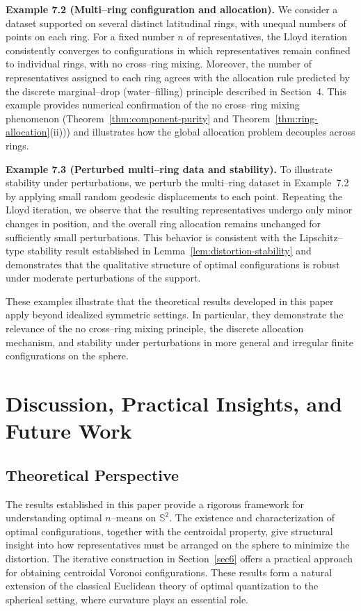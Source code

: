 \documentclass[12pt, reqno]{amsart}
\theoremstyle{plain}
\theoremstyle{definition}
\newcommand{\D}[1]{\mathbb{#1}}%
\begin{document}
\medskip
\noindent\textbf{Example 7.2 (Multi--ring configuration and allocation).}
We consider a dataset supported on several distinct latitudinal rings, with unequal
numbers of points on each ring.
For a fixed number $n$ of representatives, the Lloyd iteration consistently converges
to configurations in which representatives remain confined to individual rings, with
no cross--ring mixing.
Moreover, the number of representatives assigned to each ring agrees with the
allocation rule predicted by the discrete marginal--drop (water--filling) principle
described in Section~4.
This example provides numerical confirmation of the no cross--ring mixing phenomenon
(Theorem~\ref{thm:component-purity} and
Theorem~\ref{thm:ring-allocation}(ii))) and illustrates how the global allocation problem decouples
across rings.

\medskip
\noindent\textbf{Example 7.3 (Perturbed multi--ring data and stability).}
To illustrate stability under perturbations, we perturb the multi--ring dataset in
Example~7.2 by applying small random geodesic displacements to each point.
Repeating the Lloyd iteration, we observe that the resulting representatives undergo
only minor changes in position, and the overall ring allocation remains unchanged for
sufficiently small perturbations.
This behavior is consistent with the Lipschitz--type stability result established in
Lemma~\ref{lem:distortion-stability} and demonstrates that the qualitative structure of optimal configurations is
robust under moderate perturbations of the support.

\medskip
These examples illustrate that the theoretical results developed in this paper apply
beyond idealized symmetric settings.
In particular, they demonstrate the relevance of the no cross--ring mixing principle,
the discrete allocation mechanism, and stability under perturbations in more general
and irregular finite configurations on the sphere.
 
 
 
 
 
 
 
 
 
 
 \section{Discussion, Practical Insights, and Future Work}\label{sec8}

\subsection{Theoretical Perspective}
The results established in this paper provide a rigorous framework for understanding optimal $n$--means on
$\D S^2$. The existence and characterization of optimal configurations, together with the centroidal property,
give structural insight into how representatives must be arranged on the sphere to minimize the distortion.
The iterative construction in Section~\ref{sec6} offers a practical approach for obtaining centroidal Voronoi
configurations. These results form a natural extension of the classical Euclidean theory of optimal
quantization to the spherical setting, where curvature plays an essential role.
\end{document}
